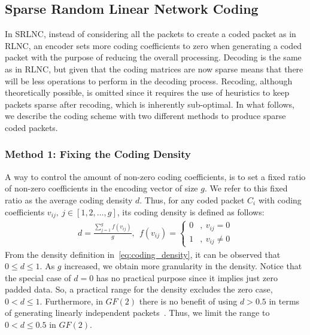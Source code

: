 \subsection{Sparse Random Linear Network Coding}

In \ac{SRLNC}, instead of considering all the packets to create a
coded packet as in \ac{RLNC}, an encoder sets more coding coefficients
to zero when generating a coded packet with the purpose of reducing
the overall processing.  Decoding is the same as in \ac{RLNC}, but
given that the coding matrices are now sparse means that there will be less
operations to perform in the decoding process.  Recoding, although
theoretically possible, is omitted since it requires the use of
heuristics to keep packets sparse after recoding, which is inherently
sub-optimal.
In what follows, we describe the coding scheme with two
different methods to produce sparse coded packets.

\subsubsection{Method 1: Fixing the Coding Density}
A way to control the amount of non-zero coding coefficients, is to set a
fixed ratio of non-zero coefficients in the encoding vector of size $g$. We
refer to this fixed ratio as the average coding density $d$. Thus, for any
coded packet $C_i$ with coding coefficients $v_{ij},\ j \in [1,2,\ldots,g]$, its
coding density is defined as follows:
%
\begin{align}
\label{eq:coding_density}
d = \frac{\sum_{j=1}^{g} f(v_{ij})}{g},\ \
    f(v_{ij}) =
    \begin{cases}
        0 &,\ v_{ij} = 0 \\
        1 &,\ v_{ij} \neq 0
    \end{cases}
\end{align}
%
From the density definition in~\eqref{eq:coding_density}, it can be
observed that $0 \leq d \leq 1$. As $g$ increased, we obtain more
granularity in the density. Notice that the special case of  $d = 0$ has no
practical purpose since it implies just zero padded data.
So, a practical
range for the density excludes the zero case, $0 < d \leq 1$.
%
Furthermore, in $GF(2)$ there is no benefit of using $d > 0.5$ in terms of
generating linearly independent packets~\cite{realworld_nc2013}. Thus,
we limit the range to $0 < d \leq 0.5$ in $GF(2)$. 

